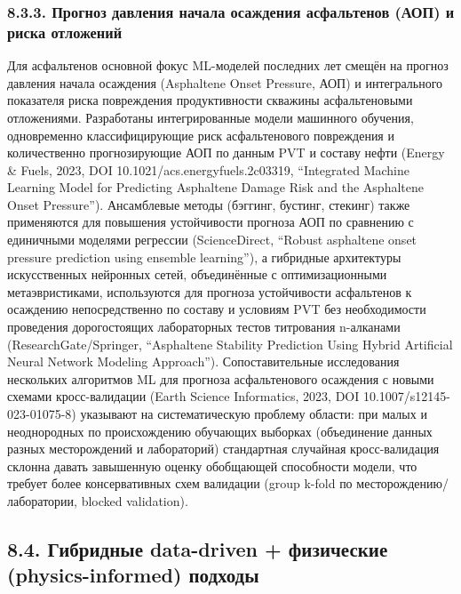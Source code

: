 \documentclass[11pt]{extarticle}
\begin{document}
\subsubsection{8.3.3. Прогноз давления начала осаждения асфальтенов (АОП) и риска отложений}\label{ux43fux440ux43eux433ux43dux43eux437-ux434ux430ux432ux43bux435ux43dux438ux44f-ux43dux430ux447ux430ux43bux430-ux43eux441ux430ux436ux434ux435ux43dux438ux44f-ux430ux441ux444ux430ux43bux44cux442ux435ux43dux43eux432-ux430ux43eux43f-ux438-ux440ux438ux441ux43aux430-ux43eux442ux43bux43eux436ux435ux43dux438ux439}

Для асфальтенов основной фокус ML-моделей последних лет смещён на прогноз давления начала осаждения (Asphaltene Onset Pressure, АОП) и интегрального показателя риска повреждения продуктивности скважины асфальтеновыми отложениями. Разработаны интегрированные модели машинного обучения, одновременно классифицирующие риск асфальтенового повреждения и количественно прогнозирующие АОП по данным PVT и составу нефти (Energy \& Fuels, 2023, DOI 10.1021/acs.energyfuels.2c03319, ``Integrated Machine Learning Model for Predicting Asphaltene Damage Risk and the Asphaltene Onset Pressure''). Ансамблевые методы (бэггинг, бустинг, стекинг) также применяются для повышения устойчивости прогноза АОП по сравнению с единичными моделями регрессии (ScienceDirect, ``Robust asphaltene onset pressure prediction using ensemble learning''), а гибридные архитектуры искусственных нейронных сетей, объединённые с оптимизационными метаэвристиками, используются для прогноза устойчивости асфальтенов к осаждению непосредственно по составу и условиям PVT без необходимости проведения дорогостоящих лабораторных тестов титрования n-алканами (ResearchGate/Springer, ``Asphaltene Stability Prediction Using Hybrid Artificial Neural Network Modeling Approach''). Сопоставительные исследования нескольких алгоритмов ML для прогноза асфальтенового осаждения с новыми схемами кросс-валидации (Earth Science Informatics, 2023, DOI 10.1007/s12145-023-01075-8) указывают на систематическую проблему области: при малых и неоднородных по происхождению обучающих выборках (объединение данных разных месторождений и лабораторий) стандартная случайная кросс-валидация склонна давать завышенную оценку обобщающей способности модели, что требует более консервативных схем валидации (group k-fold по месторождению/лаборатории, blocked validation).

\subsection{8.4. Гибридные data-driven + физические (physics-informed) подходы}\label{ux433ux438ux431ux440ux438ux434ux43dux44bux435-data-driven-ux444ux438ux437ux438ux447ux435ux441ux43aux438ux435-physics-informed-ux43fux43eux434ux445ux43eux434ux44b}
\end{document}
